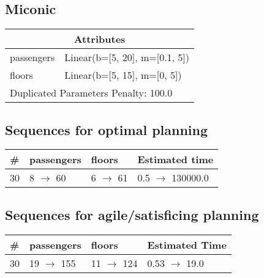 \documentclass{article}
\begin{document}
                            \newpage \subsection{Miconic}
                    \begin{center}
                    \begin{tabular}{@{}p{}p{}@{}}
                    \multicolumn{2}{c}{\bf \large Attributes}\\\midrule
                    passengers & Linear(b=[5, 20], m=[0.1, 5])\\
floors & Linear(b=[5, 15], m=[0, 5]) \\\midrule
                    \multicolumn{2}{l}{Duplicated Parameters Penalty: 100.0}
                    \end{tabular}
                    \end{center}
                
                            \subsection*{Sequences for optimal planning}

                            \begin{center}
                            \begin{tabular}{@{}l|l|l|l@{}}
                            \# & passengers & floors & Estimated time\\\midrule
                            30&8 $\rightarrow$ 60&6 $\rightarrow$ 61&0.5 $\rightarrow$ 130000.0
                            \end{tabular}
                            \end{center}
                    
                         \subsection*{Sequences for agile/satisficing planning}

                        \begin{center}
                        \begin{tabular}{@{}l|l|l|l@{}}
                        \# & passengers & floors & Estimated Time\\\midrule
                        30&19 $\rightarrow$ 155&11 $\rightarrow$ 124&0.53 $\rightarrow$ 19.0
                        \end{tabular}
                        \end{center}
                    
\end{document}
